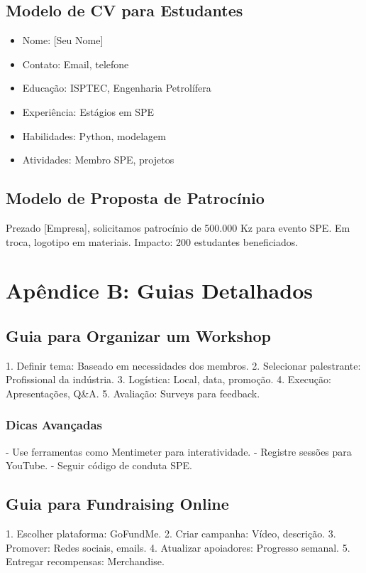 \documentclass[12pt]{article}
\begin{document}
\subsection{Modelo de CV para Estudantes}
\begin{itemize}
    \item Nome: [Seu Nome]
    \item Contato: Email, telefone
    \item Educação: ISPTEC, Engenharia Petrolífera
    \item Experiência: Estágios em SPE
    \item Habilidades: Python, modelagem
    \item Atividades: Membro SPE, projetos
\end{itemize}

\subsection{Modelo de Proposta de Patrocínio}
Prezado [Empresa], solicitamos patrocínio de 500.000 Kz para evento SPE. Em troca, logotipo em materiais. Impacto: 200 estudantes beneficiados.

\section{Apêndice B: Guias Detalhados}

\subsection{Guia para Organizar um Workshop}
1. Definir tema: Baseado em necessidades dos membros.
2. Selecionar palestrante: Profissional da indústria.
3. Logística: Local, data, promoção.
4. Execução: Apresentações, Q\&A.
5. Avaliação: Surveys para feedback.

\subsubsection{Dicas Avançadas}
- Use ferramentas como Mentimeter para interatividade.
- Registre sessões para YouTube.
- Seguir código de conduta SPE.

\subsection{Guia para Fundraising Online}
1. Escolher plataforma: GoFundMe.
2. Criar campanha: Vídeo, descrição.
3. Promover: Redes sociais, emails.
4. Atualizar apoiadores: Progresso semanal.
5. Entregar recompensas: Merchandise.
\end{document}
